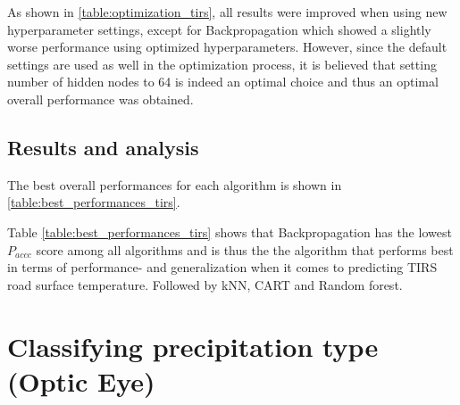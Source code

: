 	As shown in \ref{table:optimization_tirs}, all results were improved when using new hyperparameter settings, except for Backpropagation which showed a slightly worse performance using optimized hyperparameters. However, since the default settings are used as well in the optimization process, it is believed that setting number of hidden nodes to 64 is indeed an optimal choice and thus an optimal overall performance was obtained.

	\subsection{Results and analysis}
		The best overall performances for each algorithm is shown in \ref{table:best_performances_tirs}.

	\begin{table}[H]
		\centering
		\caption{Shows the overall optimal settings and performances for each of the algorithms in predicting TIRS road surface temperature.}
	\end{table}

	Table \ref{table:best_performances_tirs} shows that Backpropagation has the lowest $P_{accc}$ score among all algorithms and is thus the the algorithm that performs best in terms of performance- and generalization when it comes to predicting TIRS road surface temperature. Followed by kNN, CART and Random forest.

\section{Classifying precipitation type (Optic Eye)}


